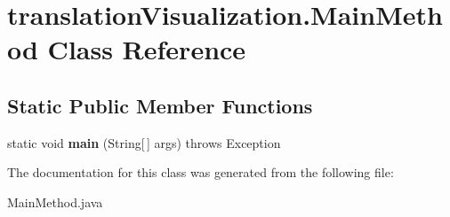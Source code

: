\hypertarget{classtranslation_visualization_1_1_main_method}{}\section{translation\+Visualization.\+Main\+Method Class Reference}
\label{classtranslation_visualization_1_1_main_method}
\subsection*{Static Public Member Functions}
\begin{DoxyCompactItemize}
\item 
\mbox{\label{classtranslation_visualization_1_1_main_method_ae2964fbea144c1f3a12599333d462ff9}} 
static void {\bfseries main} (String\mbox{[}$\,$\mbox{]} args)  throws Exception
\end{DoxyCompactItemize}


The documentation for this class was generated from the following file\+:\begin{DoxyCompactItemize}
\item 
Main\+Method.\+java\end{DoxyCompactItemize}
